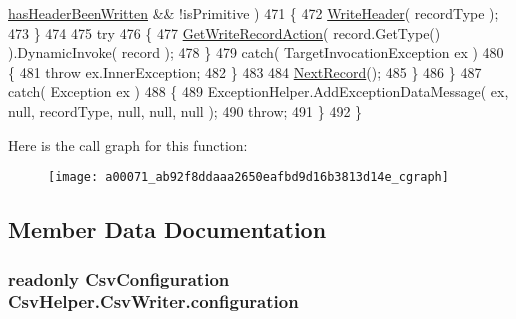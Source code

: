 \begin{DoxyCode}
      \hyperlink{a00071_a48b53b7f4428286805b1eaac1055b2bf}{hasHeaderBeenWritten} && !isPrimitive )
471                     \{
472                         \hyperlink{a00071_af2298dcd2934550fd9dd592921f18541}{WriteHeader}( recordType );
473                     \}
474 
475                     \textcolor{keywordflow}{try}
476                     \{
477                         \hyperlink{a00071_a1ab2b602b050ceb6f0a0874504ddf3f3}{GetWriteRecordAction}( record.GetType() ).DynamicInvoke( record 
      );
478                     \}
479                     \textcolor{keywordflow}{catch}( TargetInvocationException ex )
480                     \{
481                         \textcolor{keywordflow}{throw} ex.InnerException;
482                     \}
483 
484                     \hyperlink{a00071_a397af8c87002d3b9c2b5152c6981d4d2}{NextRecord}();
485                 \}
486             \}
487             \textcolor{keywordflow}{catch}( Exception ex )
488             \{
489                 ExceptionHelper.AddExceptionDataMessage( ex, null, recordType, null, null, null );
490                 \textcolor{keywordflow}{throw};
491             \}
492         \}
\end{DoxyCode}


Here is the call graph for this function\-:
\nopagebreak
\begin{figure}[H]
\begin{center}
\leavevmode
\texttt{[image: a00071\_ab92f8ddaaa2650eafbd9d16b3813d14e\_cgraph]}
\end{center}
\end{figure}




\subsection{Member Data Documentation}
\hypertarget{a00071_a0711748c9a399cfbcbad93857304fc67}{
\subsubsection[{configuration}]{\setlength{\rightskip}{0pt plus 5cm}readonly {\bf Csv\-Configuration} Csv\-Helper.\-Csv\-Writer.\-configuration\hspace{0.3cm}{\ttfamily [private]}}}\label{a00071_a0711748c9a399cfbcbad93857304fc67}


